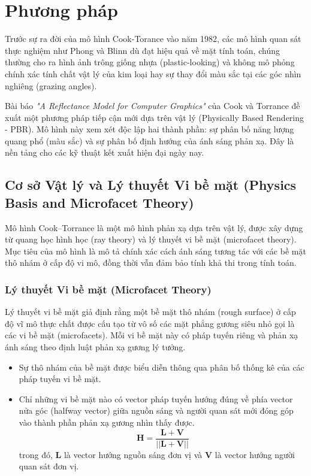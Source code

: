 \chapter{Phương pháp}
Trước sự ra đời của mô hình Cook-Torance vào năm 1982, các mô hình quan sát thực nghiệm như Phong \cite{phong2} và Blinn \cite{blinn_phong3} dù đạt hiệu quả về mặt tính toán, chúng thường cho ra hình ảnh trông giống nhựa (plastic-looking) và không mô phỏng chính xác tính chất vật lý của kim loại hay sự thay đổi màu sắc tại các góc nhìn nghiêng (grazing angles).

Bài báo \textit{"A Reflectance Model for Computer Graphics"} \cite{a_reflectance_model_1982} của Cook và Torrance đề xuất một phương pháp tiếp cận mới dựa trên vật lý (Physically Based Rendering - PBR). Mô hình này xem xét độc lập hai thành phần: sự phân bố năng lượng quang phổ (màu sắc) và sự phân bố định hướng của ánh sáng phản xạ. Đây là nền tảng cho các kỹ thuật kết xuất hiện đại ngày nay.

\section{Cơ sở Vật lý và Lý thuyết Vi bề mặt (Physics Basis and Microfacet Theory)}

Mô hình Cook--Torrance là một mô hình phản xạ dựa trên vật lý, được xây dựng từ quang học hình học (ray theory) và lý thuyết vi bề mặt (microfacet theory). Mục tiêu của mô hình là mô tả chính xác cách ánh sáng tương tác với các bề mặt thô nhám ở cấp độ vi mô, đồng thời vẫn đảm bảo tính khả thi trong tính toán.

\subsection{Lý thuyết Vi bề mặt (Microfacet Theory)}

Lý thuyết vi bề mặt giả định rằng một bề mặt thô nhám (rough surface) ở cấp độ vĩ mô thực chất được cấu tạo từ vô số các mặt phẳng gương siêu nhỏ gọi là các vi bề mặt (microfacets). Mỗi vi bề mặt này có pháp tuyến riêng và phản xạ ánh sáng theo định luật phản xạ gương lý tưởng.

\begin{itemize}
	\item Sự thô nhám của bề mặt được biểu diễn thông qua phân bố thống kê của các pháp tuyến vi bề mặt.
    \item Chỉ những vi bề mặt nào có vector pháp tuyến hướng đúng về phía vector nửa góc (halfway vector) giữa nguồn sáng và người quan sát mới đóng góp vào thành phần phản xạ gương nhìn thấy được.
    \begin{equation}
		\mathbf{H} = \frac{\mathbf{L} + \mathbf{V}}{||\mathbf{L} + \mathbf{V}||}
    \end{equation}
    trong đó, $\mathbf{L}$ là vector hướng nguồn sáng đơn vị và $\mathbf{V}$ là vector hướng người quan sát đơn vị.
\end{itemize}


